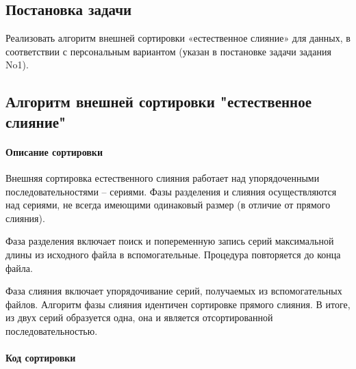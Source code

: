 \documentclass[a4paper, 14pt]{extarticle}
\begin{document}
\subsection{Постановка задачи}
Реализовать алгоритм внешней сортировки «естественное слияние» для
данных, в соответствии с персональным вариантом (указан в постановке
задачи задания No1).
\subsection{Алгоритм внешней сортировки "естественное слияние"}
\paragraph{Описание сортировки}
Внешняя сортировка естественного слияния работает над упорядоченными
последовательностями – сериями. Фазы разделения и слияния осуществляются
над сериями, не всегда имеющими одинаковый размер (в отличие от прямого
слияния).

Фаза разделения включает поиск и попеременную запись серий
максимальной длины из исходного файла в вспомогательные. Процедура
повторяется до конца файла.

Фаза слияния включает упорядочивание серий, получаемых из
вспомогательных файлов. Алгоритм фазы слияния идентичен сортировке
прямого слияния. В итоге, из двух серий образуется одна, она и является
отсортированной последовательностью.
\paragraph{Код сортировки}

\end{document}
